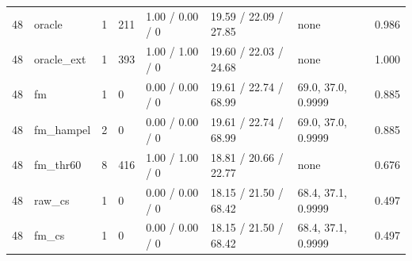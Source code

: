 \begin{table}[ht]
\begin{tabular}{llllllll}
48 & oracle & 1 & 211 & 1.00 / 0.00 / 0 & 19.59 / 22.09 / 27.85 & none & 0.986 \\
48 & oracle\_ext & 1 & 393 & 1.00 / 1.00 / 0 & 19.60 / 22.03 / 24.68 & none & 1.000 \\
48 & fm & 1 & 0 & 0.00 / 0.00 / 0 & 19.61 / 22.74 / 68.99 & 69.0, 37.0, 0.9999 & 0.885 \\
48 & fm\_hampel & 2 & 0 & 0.00 / 0.00 / 0 & 19.61 / 22.74 / 68.99 & 69.0, 37.0, 0.9999 & 0.885 \\
48 & fm\_thr60 & 8 & 416 & 1.00 / 1.00 / 0 & 18.81 / 20.66 / 22.77 & none & 0.676 \\
48 & raw\_cs & 1 & 0 & 0.00 / 0.00 / 0 & 18.15 / 21.50 / 68.42 & 68.4, 37.1, 0.9999 & 0.497 \\
48 & fm\_cs & 1 & 0 & 0.00 / 0.00 / 0 & 18.15 / 21.50 / 68.42 & 68.4, 37.1, 0.9999 & 0.497 \\
\bottomrule
\end{tabular}
\end{table}

